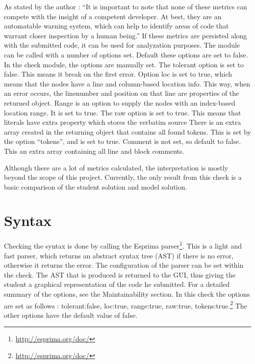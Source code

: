 As stated by the author : ``It is important to note that none of these metrics can compete with the insight of a competent developer. At best, they are an automatable warning system, which can help to identify areas of code that warrant closer inspection by a human being.''
If these metrics are persisted along with the submitted code, it can be used for
analyzation purposes. The module can be called with a number of options set.
Default these options are set to false.
In the \gls{check} module, the options are manually set.
The tolerant option is set to false. This means it break on the first error.
Option loc is set to true, which means that the nodes have a line and column-based location info.
This way, when an error occurs, the linenumber and position on that line are properties of the returned object.
Range is an option to supply the nodes with an index-based location range. It is set to true.
The raw option is set to true. This means that literals have extra property which stores the verbatim source
There is an extra array created in the returning object that contains all found tokens.
This is set by the option ``tokens'', and is set to true.
Comment is not set, so default to false.
This an extra array containing all line and block comments.

Although there are a lot of metrics calculated, the interpretation is mostly
beyond the scope of this project. Currently, the only result from this check is
a basic comparison of the \gls{student} \gls{solution} and model \gls{solution}.

\section{Syntax}
Checking the syntax is done by calling the Esprima 
parser\footnote{\url{http://esprima.org/doc/}}. This is a light and fast parser, 
which returns an abstract syntax tree (AST) if there is no error, otherwise it returns
the error. The configuration of the parser can be set within the check.
The AST that is produced is returned to the GUI, thus giving the \gls{student} a
graphical representation of the code he submitted.
For a detailed summary of the options, see the Maintainability section.
In this \gls{check} the options are set as follows : tolerant:false, loc:true,
range:true, raw:true, tokens:true.\footnote{\url{http://esprima.org/doc/}}
The other options have the default value of false.

